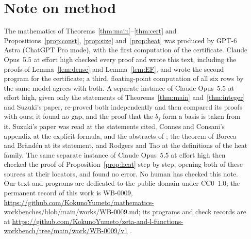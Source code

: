 \documentclass[11pt,a4paper]{article}
\theoremstyle{plain}
\theoremstyle{remark}
\newcommand{\workbenchurl}{https://github.com/KokunoYumeto/zeta-and-l-functions-workbench/tree/main/work/WB-0009/v1}
\newcommand{\recordurl}{https://github.com/KokunoYumeto/mathematics-workbenches/blob/main/works/WB-0009.md}
\begin{document}
\section*{Note on method}
The mathematics of Theorems~\ref{thm:main}--\ref{thm:cert} and Propositions~\ref{prop:const}, \ref{prop:size}
and~\ref{prop:heat} was
produced by GPT-6 Astra (ChatGPT Pro mode), with the first computation of the certificate. Claude Opus~5.5 at effort
high checked every proof and wrote this text, including the proofs of Lemma~\ref{lem:dense} and
Lemma~\ref{lem:EF}, and wrote the second program for the certificate; a third, floating-point computation of all six
rows by the same model agrees with both. A separate instance of Claude Opus~5.5 at effort high, given only the
statements of Theorems~\ref{thm:main} and~\ref{thm:integer} and Suzuki's paper, re-proved both independently and
then compared its proofs with ours; it found no gap, and the proof that the $b_j$ form a basis is taken from it.
Suzuki's paper was read at the
statements cited, Connes and Consani's appendix at the explicit formula, and the abstracts of
\cite{alpoge-furman,lamzouri,mori,groskin,kim,platt-trudgian}; the theorem of Borcea and Br\"and\'en at its statement, and Rodgers and Tao
at the definitions of the heat family. The same separate instance of Claude Opus~5.5 at effort high then checked
the proof of Proposition~\ref{prop:heat} step by step, opening both of these sources at their locators, and found no
error. No human has checked this note. Our text and programs are dedicated to the public domain under CC0~1.0;
the permanent record of this work is WB-0009, \expandafter\url\expandafter{\recordurl}; its programs and check
records are at \expandafter\url\expandafter{\workbenchurl} \cite{wb}.
\end{document}
